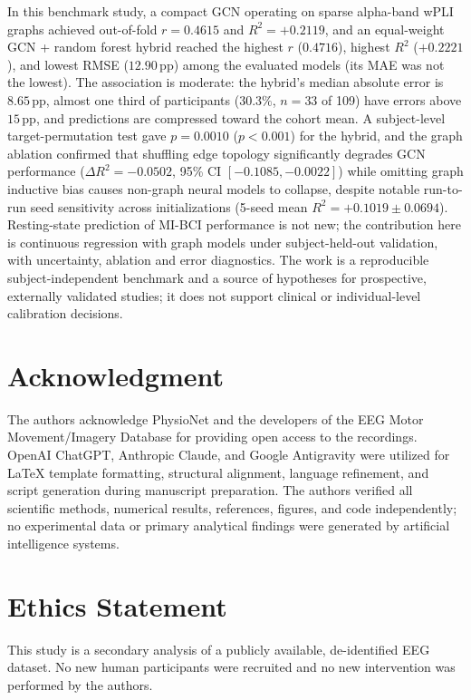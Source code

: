 \documentclass{ieeeaccess}
\newcommand{\pp}{\,\text{pp}}
\begin{document}
In this benchmark study, a compact GCN operating on sparse alpha-band wPLI graphs achieved out-of-fold $r = 0.4615$ and $R^2 = +0.2119$, and an equal-weight GCN + random forest hybrid reached the highest $r$ ($0.4716$), highest $R^2$ ($+0.2221$), and lowest RMSE ($12.90\pp$) among the evaluated models (its MAE was not the lowest). The association is moderate: the hybrid's median absolute error is $8.65\pp$, almost one third of participants ($30.3\%$, $n=33$ of 109) have errors above $15\pp$, and predictions are compressed toward the cohort mean. A subject-level target-permutation test gave $p = 0.0010$ ($p < 0.001$) for the hybrid, and the graph ablation confirmed that shuffling edge topology significantly degrades GCN performance ($\Delta R^2 = -0.0502$, 95\% CI $[-0.1085, -0.0022]$) while omitting graph inductive bias causes non-graph neural models to collapse, despite notable run-to-run seed sensitivity across initializations (5-seed mean $R^2 = +0.1019 \pm 0.0694$). Resting-state prediction of MI-BCI performance is not new; the contribution here is continuous regression with graph models under subject-held-out validation, with uncertainty, ablation and error diagnostics. The work is a reproducible subject-independent benchmark and a source of hypotheses for prospective, externally validated studies; it does not support clinical or individual-level calibration decisions.
\section*{Acknowledgment}

The authors acknowledge PhysioNet and the developers of the EEG Motor Movement/Imagery Database for providing open access to the recordings. OpenAI ChatGPT, Anthropic Claude, and Google Antigravity were utilized for LaTeX template formatting, structural alignment, language refinement, and script generation during manuscript preparation. The authors verified all scientific methods, numerical results, references, figures, and code independently; no experimental data or primary analytical findings were generated by artificial intelligence systems.

\section*{Ethics Statement}

This study is a secondary analysis of a publicly available, de-identified EEG dataset. No new human participants were recruited and no new intervention was performed by the authors.
\end{document}
